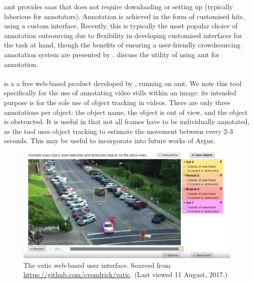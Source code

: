 \gls{amt} provides \gls{saas} that does not require downloading or setting up (typically laborious for annotators). Annotation is achieved in the form of customised \glspl{hit}, using a custom interface. Recently, this is typically the most popular choice of annotation outsourcing \citep{Lin:2014vma,Veit:2016vj,Chen:2015ur,JiaDeng:2009dl,Netzer:2011to} due to flexibility in developing customised interfaces for the task at hand, though the benefits of ensuring a user-friendly crowdsourcing annotation system are presented by \citet{Matera:2014wq}. \citet{Sorokin:2008uk} discuss the utility of using \gls{amt} for annotation.

\paragraph{}

 is a a free web-based product developed by \citet{springerlink:10.1007/s11263-012-0564-1}, running on \gls{amt}. We note this tool specifically for the use of annotating video stills within an image: its intended purpose is for the sole use of object tracking in videos. There are only three annotations per object: the object name, the object is out of view, and the object is obstructed. It is useful in that not all frames have to be individually annotated, as the tool uses object tracking to estimate the movement between every 2-3 seconds. This may be useful to incorporate into future works of Argus. 

\begin{figure}[p]
  \includegraphics[width=\textwidth]{images/dataset/tools/vatic}
  \caption[The VATIC web-based user interface]{The \gls{vatic} web-based user interface. Sourced from \url{https://github.com/cvondrick/vatic}. (Last viewed 11 August, 2017.)}
\end{figure}

